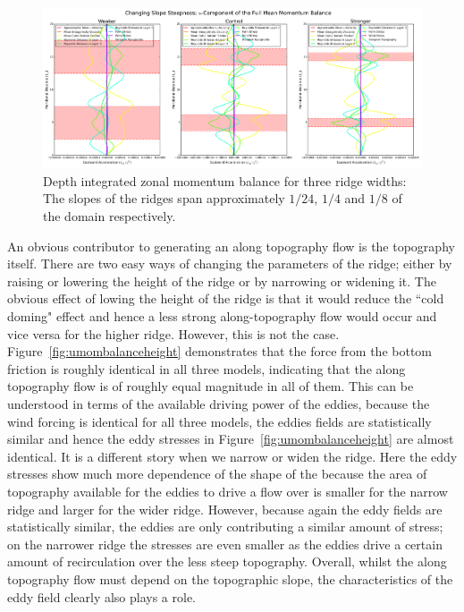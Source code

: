 \documentclass[12pt,a4paper]{report}
\newcommand*\figref[1]{Figure~\ref{#1}}
\begin{document}
  \begin{figure}
  	\centering
  	\includegraphics[width=\linewidth]{umom_3_4}
  	\caption{ Depth integrated zonal momentum balance for three ridge widths: 
  		The slopes of the ridges span approximately $1/24$, $1/4$ and $1/8$
  		of the domain respectively.}
  	\label{fig:umombalancewidth}
  \end{figure}
    
  An obvious contributor to generating an along topography flow is the topography
  itself. There are two easy ways of changing the parameters of the ridge; either
  by raising or lowering the height of the ridge or by narrowing or widening it. 
  The obvious effect of lowing the height of the ridge is that it would reduce the 
  ``cold doming" effect and hence a less strong along-topography flow would occur
  and vice versa for the higher ridge. 
  However, this is not the case. \figref{fig:umombalanceheight} demonstrates that
  the force from the bottom friction is roughly identical in all three models, 
  indicating that the along topography flow is of roughly equal magnitude in all of them.
  This can be understood in terms of the available driving power of the eddies,
  because the wind forcing is identical for all three models, the eddies fields
  are statistically similar and hence the eddy stresses in \figref{fig:umombalanceheight}
  are almost identical. It is a different story when we narrow or widen the ridge.
  Here the eddy stresses show much more dependence of the shape of the because
  the area of topography available for the eddies to drive a flow over is smaller 
  for the narrow ridge and larger for the wider ridge. However, because again the
  eddy fields are statistically similar, the eddies are only contributing 
  a similar amount of stress; on the narrower ridge the stresses are even smaller
  as the eddies drive a certain amount of recirculation over the less steep topography.
  Overall, whilst the along topography flow must depend on the topographic slope,
  the characteristics of the eddy field clearly also plays a role.
  
\end{document}
